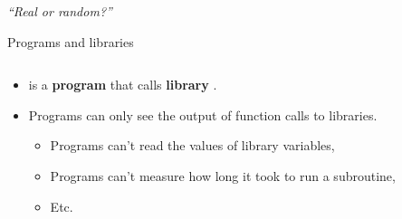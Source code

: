\documentclass[aspectratio=169, lualatex, handout]{beamer}
\begin{document}
\begin{frame}
	\begin{center}
		\huge \textit{``Real or random?''}
	\end{center}
\end{frame}

\begin{frame}{Programs and libraries}
	\begin{columns}[c]
		\begin{column}{0.5\textwidth}
			\begin{itemize}[<+->]
				\item \prog{} is a \textbf{program} that calls \textbf{library} .
				\item Programs can only see the output of function calls to libraries.
				      \begin{itemize}[<+->]
					      \item Programs can't read the values of library variables,
					      \item Programs can't measure how long it took to run a subroutine,
					      \item Etc.
				      \end{itemize}
			\end{itemize}
		\end{column}
		\begin{column}{0.5\textwidth}
		\end{column}
	\end{columns}
\end{frame}
\end{document}

